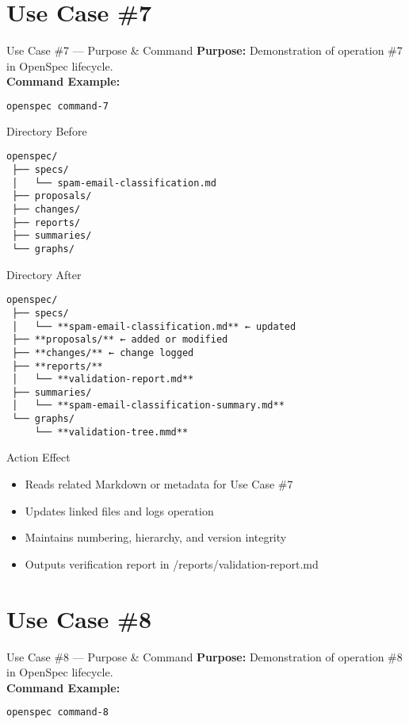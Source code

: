 \documentclass[aspectratio=169]{beamer}
\begin{document}
\section*{Use Case \#7}
\begin{frame}{Use Case \#7 --- Purpose \& Command}
\textbf{Purpose:} Demonstration of operation \#7 in OpenSpec lifecycle.\\[4pt]
\textbf{Command Example:}
\begin{lstlisting}[language=bash]
openspec command-7
\end{lstlisting}
\end{frame}

\begin{frame}{Directory Before}
\begin{lstlisting}
openspec/
 ├── specs/
 │   └── spam-email-classification.md
 ├── proposals/
 ├── changes/
 ├── reports/
 ├── summaries/
 └── graphs/
\end{lstlisting}
\end{frame}

\begin{frame}{Directory After}
\begin{lstlisting}
openspec/
 ├── specs/
 │   └── **spam-email-classification.md** ← updated
 ├── **proposals/** ← added or modified
 ├── **changes/** ← change logged
 ├── **reports/**
 │   └── **validation-report.md**
 ├── summaries/
 │   └── **spam-email-classification-summary.md**
 └── graphs/
     └── **validation-tree.mmd**
\end{lstlisting}
\end{frame}

\begin{frame}{Action Effect}
\begin{itemize}
  \item Reads related Markdown or metadata for Use Case \#7
  \item Updates linked files and logs operation
  \item Maintains numbering, hierarchy, and version integrity
  \item Outputs verification report in /reports/validation-report.md
\end{itemize}
\end{frame}

\section*{Use Case \#8}
\begin{frame}{Use Case \#8 --- Purpose \& Command}
\textbf{Purpose:} Demonstration of operation \#8 in OpenSpec lifecycle.\\[4pt]
\textbf{Command Example:}
\begin{lstlisting}[language=bash]
openspec command-8
\end{lstlisting}
\end{frame}
\end{document}
